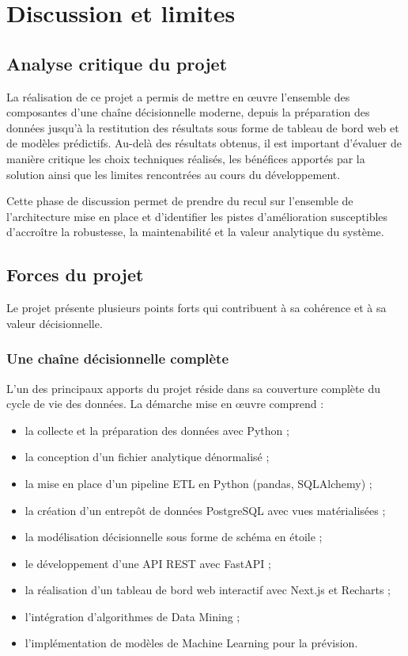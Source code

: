 \documentclass[12pt,a4paper,twoside]{report}
\begin{document}
\chapter{Discussion et limites}

\section{Analyse critique du projet}

La réalisation de ce projet a permis de mettre en œuvre l'ensemble des composantes d'une chaîne décisionnelle moderne, depuis la préparation des données jusqu'à la restitution des résultats sous forme de tableau de bord web et de modèles prédictifs. Au-delà des résultats obtenus, il est important d'évaluer de manière critique les choix techniques réalisés, les bénéfices apportés par la solution ainsi que les limites rencontrées au cours du développement.

Cette phase de discussion permet de prendre du recul sur l'ensemble de l'architecture mise en place et d'identifier les pistes d'amélioration susceptibles d'accroître la robustesse, la maintenabilité et la valeur analytique du système.

\section{Forces du projet}

Le projet présente plusieurs points forts qui contribuent à sa cohérence et à sa valeur décisionnelle.

\subsection{Une chaîne décisionnelle complète}

L'un des principaux apports du projet réside dans sa couverture complète du cycle de vie des données. La démarche mise en œuvre comprend :
\begin{itemize}
    \item la collecte et la préparation des données avec Python ;
    \item la conception d'un fichier analytique dénormalisé ;
    \item la mise en place d'un pipeline ETL en Python (pandas, SQLAlchemy) ;
    \item la création d'un entrepôt de données PostgreSQL avec vues matérialisées ;
    \item la modélisation décisionnelle sous forme de schéma en étoile ;
    \item le développement d'une API REST avec FastAPI ;
    \item la réalisation d'un tableau de bord web interactif avec Next.js et Recharts ;
    \item l'intégration d'algorithmes de Data Mining ;
    \item l'implémentation de modèles de Machine Learning pour la prévision.
\end{itemize}
\end{document}
